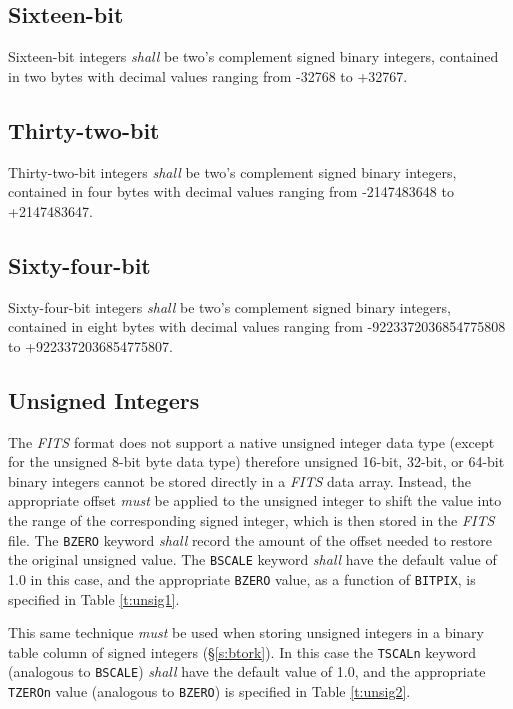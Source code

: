 \documentclass[11pt,makeidx]{book}     %
\begin{document}
   \subsection{Sixteen-bit}
   Sixteen-bit integers {\em shall} be two's complement
   signed binary
   integers, contained in two bytes with decimal values ranging from -32768 
   to +32767.


   \subsection{Thirty-two-bit}
   Thirty-two-bit integers {\em shall} be
   two's complement
   signed
   binary integers, contained in four
   bytes with decimal values ranging from -2147483648 
   to +2147483647. 

   \subsection{Sixty-four-bit}
   Sixty-four-bit integers {\em shall} be two's 
   complement signed binary integers, contained
   \newline in eight
   bytes  with decimal values ranging from -9223372036854775808 to 
   \newline +9223372036854775807. 

\subsection{Unsigned Integers}
\label{s:Unsigned_Integers}

The {\em FITS\/} format does not support a native unsigned integer
data type (except for the unsigned 8-bit byte data type) therefore
unsigned 16-bit, 32-bit, or 64-bit binary integers cannot be
stored directly in a {\em FITS\/} data array.  
Instead, 
the appropriate offset {\em must} be applied to the unsigned integer
to shift the value into the range of the corresponding signed integer, which is
then stored in the {\em FITS\/} file.  The \verb+BZERO+ keyword {\em shall}
record the amount of the offset needed to restore the original
unsigned value.  The {\tt BSCALE} 
keyword {\em shall} have the default value of 1.0 in this case,
and the appropriate {\tt BZERO} value, as a function of {\tt BITPIX},
is specified in Table \ref{t:unsig1}.

This same technique {\em must} be used when storing unsigned
integers in a binary table column of signed integers (\S\ref{s:btork}).  
In this case the {\tt TSCALn} keyword (analogous to {\tt BSCALE}) 
{\em shall} have the default value of 1.0,
and the appropriate {\tt TZEROn} value (analogous to {\tt BZERO})
is specified in Table \ref{t:unsig2}.
\end{document}
